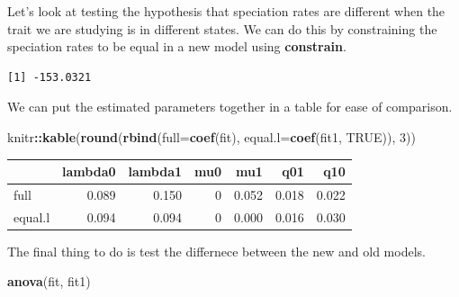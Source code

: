 \documentclass[
]{book}
\newenvironment{Shaded}{\begin{snugshade}}{\end{snugshade}}
\newcommand{\DataTypeTok}[1]{\textcolor[rgb]{0.13,0.29,0.53}{#1}}
\newcommand{\DecValTok}[1]{\textcolor[rgb]{0.00,0.00,0.81}{#1}}
\newcommand{\KeywordTok}[1]{\textcolor[rgb]{0.13,0.29,0.53}{\textbf{#1}}}
\newcommand{\NormalTok}[1]{#1}
\newcommand{\OperatorTok}[1]{\textcolor[rgb]{0.81,0.36,0.00}{\textbf{#1}}}
\newcommand{\OtherTok}[1]{\textcolor[rgb]{0.56,0.35,0.01}{#1}}
\newcommand{\StringTok}[1]{\textcolor[rgb]{0.31,0.60,0.02}{#1}}
\begin{document}
Let's look at testing the hypothesis that speciation rates are different when the trait we are studying is in different states. We can do this by constraining the speciation rates to be equal in a new model using \textbf{constrain}.

\begin{Shaded}
\end{Shaded}

\begin{verbatim}
[1] -153.0321
\end{verbatim}

We can put the estimated parameters together in a table for ease of comparison.

\begin{Shaded}
\begin{Highlighting}[]
\NormalTok{knitr}\OperatorTok{::}\KeywordTok{kable}\NormalTok{(}\KeywordTok{round}\NormalTok{(}\KeywordTok{rbind}\NormalTok{(}\DataTypeTok{full=}\KeywordTok{coef}\NormalTok{(fit), }\DataTypeTok{equal.l=}\KeywordTok{coef}\NormalTok{(fit1, }\OtherTok{TRUE}\NormalTok{)), }\DecValTok{3}\NormalTok{))}
\end{Highlighting}
\end{Shaded}

\begin{tabular}{l|r|r|r|r|r|r}
\hline
  & lambda0 & lambda1 & mu0 & mu1 & q01 & q10\\
\hline
full & 0.089 & 0.150 & 0 & 0.052 & 0.018 & 0.022\\
\hline
equal.l & 0.094 & 0.094 & 0 & 0.000 & 0.016 & 0.030\\
\hline
\end{tabular}

The final thing to do is test the differnece between the new and old models.

\begin{Shaded}
\begin{Highlighting}[]
\KeywordTok{anova}\NormalTok{(fit, fit1)}
\end{Highlighting}
\end{Shaded}
\end{document}
